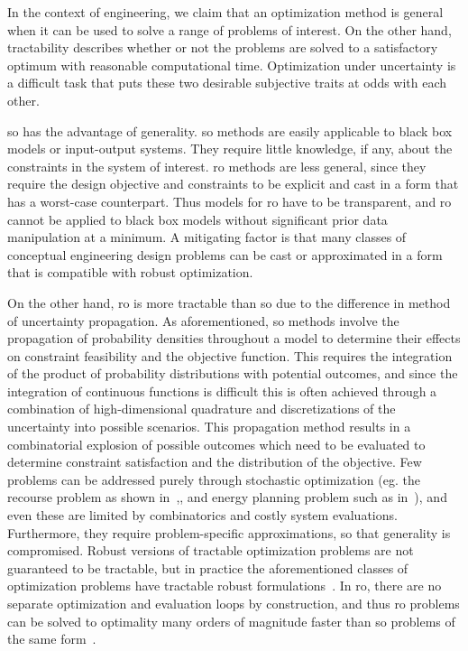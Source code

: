 In the context of engineering, we claim that an optimization method is general
when it can be used to solve a range of problems of interest. On the other hand,
tractability describes whether or not the problems are solved to a satisfactory
optimum with reasonable computational time. Optimization
under uncertainty is a difficult task that puts these two desirable subjective traits
at odds with each other.

\gls{so} has the advantage of generality.
\gls{so} methods are easily applicable to black box models or input-output systems.
They require little knowledge, if any, about the constraints in the system of interest.
\gls{ro} methods are less general, since they require
the design objective and constraints to be explicit and cast in a form that has a worst-case
counterpart. Thus models for \gls{ro} have to be transparent,
and \gls{ro} cannot be applied to black box models without significant prior data
manipulation at a minimum. A mitigating factor is that
many classes of conceptual engineering design problems can be cast or approximated in a form that
is compatible with robust optimization.

On the other hand, \gls{ro} is more tractable than \gls{so} due to the difference in method of uncertainty propagation.
As aforementioned, \gls{so} methods involve the propagation of probability densities throughout a model
to determine their effects on constraint feasibility and the objective function.
This requires the integration of the product of probability distributions with potential outcomes,
and since the integration of continuous functions is difficult this is often achieved through
a combination of high-dimensional quadrature and discretizations of the uncertainty into
possible scenarios. This propagation method
results in a combinatorial explosion of possible outcomes which need to be evaluated to determine constraint
satisfaction and the distribution of the objective. Few problems can be addressed purely
through stochastic optimization (eg. the recourse problem as
shown in~\cite{Kall1982},\cite{Higle1991}, and energy planning problem such as in~\cite{Pereira1991}), and
even these are limited by combinatorics and costly system evaluations. Furthermore, they require
problem-specific approximations, so that generality is compromised.
Robust versions of tractable optimization problems are not
guaranteed to be tractable, but in practice the aforementioned classes of optimization problems
have tractable robust formulations~\cite{Bertsimas2011}. In \gls{ro},
there are no separate optimization and evaluation
loops by construction, and thus \gls{ro} problems can be solved to optimality
many orders of magnitude faster than \gls{so} problems of the same form~\cite{Bertsimas2011}.

